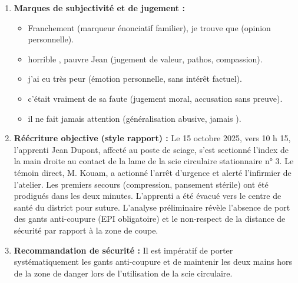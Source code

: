 \documentclass[11pt]{article}
\begin{document}
\begin{corrige}
\begin{enumerate}
\item \textbf{Marques de subjectivité et de jugement :}
\begin{itemize}
\item \og Franchement \fg (marqueur énonciatif familier), \og je trouve que \fg (opinion personnelle).
\item \og horrible \fg, \og pauvre Jean \fg (jugement de valeur, pathos, compassion).
\item \og j'ai eu très peur \fg (émotion personnelle, sans intérêt factuel).
\item \og c'était vraiment de sa faute \fg (jugement moral, accusation sans preuve).
\item \og il ne fait jamais attention \fg (généralisation abusive, \og jamais \fg).
\end{itemize}
\item \textbf{Réécriture objective (style rapport) :}
\og Le 15 octobre 2025, vers 10 h 15, l'apprenti Jean Dupont, affecté au poste de sciage, s'est sectionné l'index de la main droite au contact de la lame de la scie circulaire stationnaire n° 3. Le témoin direct, M. Kouam, a actionné l'arrêt d'urgence et alerté l'infirmier de l'atelier. Les premiers secours (compression, pansement stérile) ont été prodigués dans les deux minutes. L'apprenti a été évacué vers le centre de santé du district pour suture. L'analyse préliminaire révèle l'absence de port des gants anti-coupure (EPI obligatoire) et le non-respect de la distance de sécurité par rapport à la zone de coupe. \fg
\item \textbf{Recommandation de sécurité :} \og Il est impératif de porter systématiquement les gants anti-coupure et de maintenir les deux mains hors de la zone de danger lors de l'utilisation de la scie circulaire. \fg
\end{enumerate}
\end{corrige}
\end{document}
